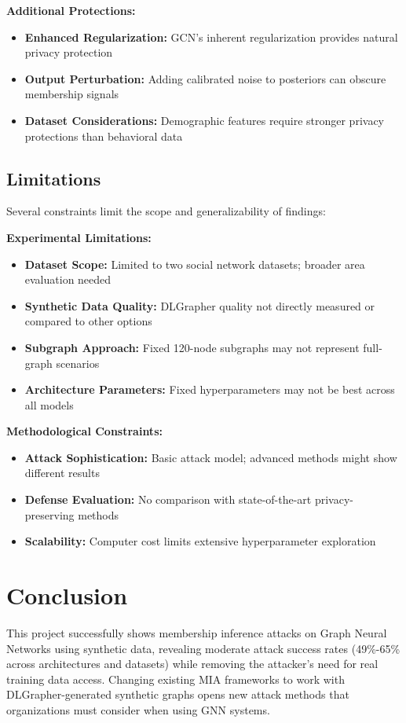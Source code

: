 \documentclass{article}
\begin{document}
\textbf{Additional Protections:}
\begin{itemize}
\item \textbf{Enhanced Regularization:} GCN's inherent regularization provides natural privacy protection
\item \textbf{Output Perturbation:} Adding calibrated noise to posteriors can obscure membership signals \cite{jayaraman2019evaluating}
\item \textbf{Dataset Considerations:} Demographic features require stronger privacy protections than behavioral data
\end{itemize}

\subsection{Limitations}
Several constraints limit the scope and generalizability of findings:

\textbf{Experimental Limitations:}
\begin{itemize}
\item \textbf{Dataset Scope:} Limited to two social network datasets; broader area evaluation needed
\item \textbf{Synthetic Data Quality:} DLGrapher quality not directly measured or compared to other options
\item \textbf{Subgraph Approach:} Fixed 120-node subgraphs may not represent full-graph scenarios
\item \textbf{Architecture Parameters:} Fixed hyperparameters may not be best across all models
\end{itemize}

\textbf{Methodological Constraints:}
\begin{itemize}
\item \textbf{Attack Sophistication:} Basic attack model; advanced methods might show different results
\item \textbf{Defense Evaluation:} No comparison with state-of-the-art privacy-preserving methods
\item \textbf{Scalability:} Computer cost limits extensive hyperparameter exploration
\end{itemize}

\section{Conclusion}
This project successfully shows membership inference attacks on Graph Neural Networks using synthetic data, revealing moderate attack success rates (49\%-65\% across architectures and datasets) while removing the attacker's need for real training data access. Changing existing MIA frameworks to work with DLGrapher-generated synthetic graphs opens new attack methods that organizations must consider when using GNN systems.
\end{document}
